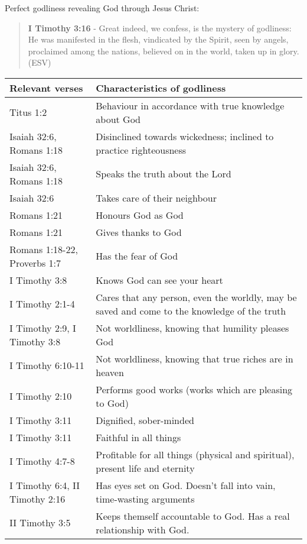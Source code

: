 \documentclass[11pt]{article}
\begin{document}
Perfect godliness revealing God through Jesus Christ:

\begin{quote}
\textbf{I Timothy 3:16} - Great indeed, we confess, is the mystery of godliness: He was manifested in the flesh, vindicated by the Spirit, seen by angels, proclaimed among the nations, believed on in the world, taken up in glory. (ESV)
\end{quote}

\begin{center}
\begin{tabular}{ll}
Relevant verses & Characteristics of godliness\\[0pt]
\hline
Titus 1:2 & Behaviour in accordance with true knowledge about God\\[0pt]
Isaiah 32:6, Romans 1:18 & Disinclined towards wickedness; inclined to practice righteousness\\[0pt]
Isaiah 32:6, Romans 1:18 & Speaks the truth about the Lord\\[0pt]
Isaiah 32:6 & Takes care of their neighbour\\[0pt]
Romans 1:21 & Honours God as God\\[0pt]
Romans 1:21 & Gives thanks to God\\[0pt]
Romans 1:18-22, Proverbs 1:7 & Has the fear of God\\[0pt]
I Timothy 3:8 & Knows God can see your heart\\[0pt]
I Timothy 2:1-4 & Cares that any person, even the worldly, may be saved and come to the knowledge of the truth\\[0pt]
I Timothy 2:9, I Timothy 3:8 & Not worldliness, knowing that humility pleases God\\[0pt]
I Timothy 6:10-11 & Not worldliness, knowing that true riches are in heaven\\[0pt]
I Timothy 2:10 & Performs good works (works which are pleasing to God)\\[0pt]
I Timothy 3:11 & Dignified, sober-minded\\[0pt]
I Timothy 3:11 & Faithful in all things\\[0pt]
I Timothy 4:7-8 & Profitable for all things (physical and spiritual), present life and eternity\\[0pt]
I Timothy 6:4, II Timothy 2:16 & Has eyes set on God. Doesn't fall into vain, time-wasting arguments\\[0pt]
II Timothy 3:5 & Keeps themself accountable to God. Has a real relationship with God.\\[0pt]

\end{tabular}
\end{center}
\end{document}
